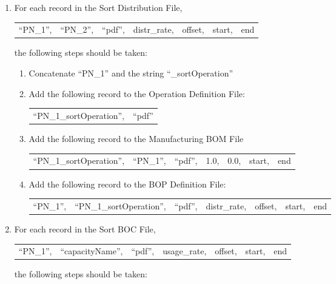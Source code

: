 \begin{enumerate}
\item For each record in the Sort Distribution File,
\begin{center}
\begin{tabular}{lllllll}
  ``PN\_1'', &``PN\_2'', &``pdf'', &distr\_rate, &offset,  &start, &end
\end{tabular}
\end{center}
the following steps should be taken:

\begin{enumerate}
\item Concatenate ``PN\_1'' and the string ``\_sortOperation''

\item Add the following record to the Operation Definition File:
\begin{center}
\begin{tabular}{ll}
 ``PN\_1\_sortOperation'', &``pdf''
\end{tabular}
\end{center}

\item Add the following record to the Manufacturing BOM File
\begin{center}
\begin{tabular}{lllllll}
 ``PN\_1\_sortOperation'', &``PN\_1'', &``pdf'', &1.0, &0.0, &start, &end
\end{tabular}
\end{center}

\item Add the following record to the BOP Definition File:
\begin{center}
\begin{tabular}{lllllll}
 ``PN\_1'', &``PN\_1\_sortOperation'',  &``pdf'', &distr\_rate, &offset, &start, &end
\end{tabular}
\end{center}

\end{enumerate}
\vspace{.5in}

\item For each record in the Sort BOC File,
\begin{center}
\begin{tabular}{lllllll}
  ``PN\_1'', &``capacityName'', &``pdf'', &usage\_rate, &offset,  &start, &end
\end{tabular}
\end{center}
the following steps should be taken:


\end{enumerate}
